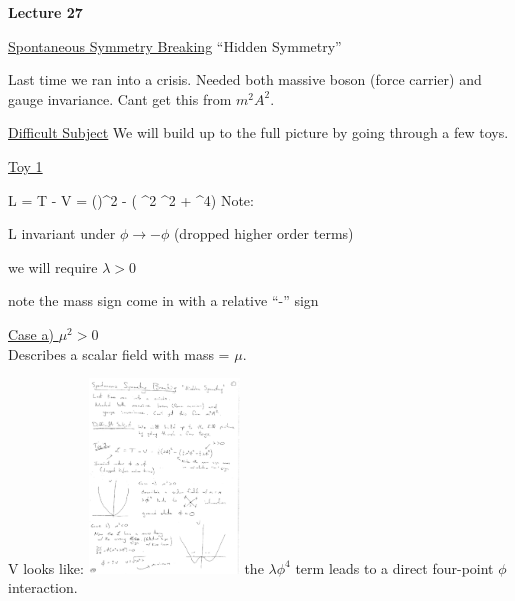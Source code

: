 
\usepackage{braket}
\usepackage{bbm}
\usepackage{relsize}
\usepackage{tcolorbox}




\usepackage{fancyhdr}

\fancyhf{}


\thispagestyle{fancy}

\begin{center}
{\huge \textbf{Lecture 27}}
\end{center}

{\fontsize{14}{16}\selectfont

\underline{\underline{Spontaneous Symmetry Breaking}}  ``Hidden Symmetry''

Last time we ran into a crisis. 
Needed both massive boson (force carrier) and gauge invariance.  
Cant get this from $m^2A^2$.


\underline{\underline{Difficult Subject}}  We will build up to the full picture by going through a few toys.

\underline{Toy 1}  

\be
L = T - V = (\partial \phi)^2 - \left( \mu^2 \phi^2 +  \lambda \phi^4\right)
\ee
Note:
\bi
\item[-] L invariant under $\phi \rightarrow  -\phi$  (dropped higher order terms)
\item[-] we will require $\lambda > 0 $
\item[-] note the mass sign come in with a relative ``-'' sign
\ei

\underline{Case a) $\mu^2 > 0$}\\
Describes a scalar field with mass = $\mu$.  

V looks like:
\bc
\includegraphics[width=0.3\textwidth]{./V_mu2positive.pdf}
\ec
the $\lambda \phi^4$ term leads to a direct four-point $\phi$ interaction.

}
